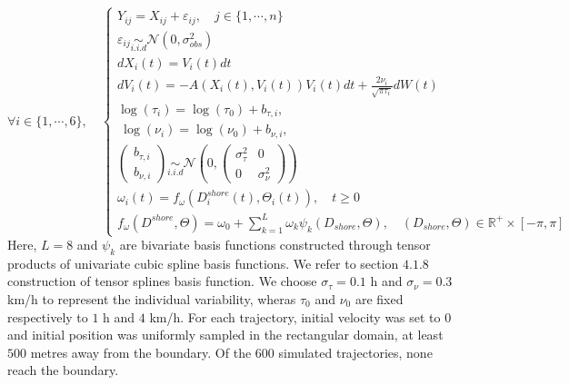 \documentclass[11pt]{article}
\newcommand {\R}{\mathbb{R}}
\newcommand {\1}{\mathbb{1}}
\begin{document}
\begin{equation}  \forall  i \in \{1,\cdots,6\}, \quad  \left\{
	\begin{array}{l}
		Y_{ij}=X_{ij}+\varepsilon_{ij}, \quad j \in \{1,\cdots, n\} \\
		\varepsilon_{ij} \underset{i.i.d}{\sim} \mathcal{N}(0,\sigma_{obs}^2) \\
		dX_i(t)=V_i(t) dt \quad \\
		dV_i(t)=-A(X_i(t),V_i(t))V_i(t)dt+\frac{2\nu_i}{\sqrt{\pi \tau_i}} dW(t)  \\
		\log(\tau_i)=\log(\tau_0)+b_{\tau,i}, \\\
		\log(\nu_i)=\log(\nu_0)+b_{\nu,i}, \\
		\begin{pmatrix} b_{\tau,i} \\ b_{\nu,i} \end{pmatrix} \underset{i.i.d}{\sim} \mathcal{N}\left(0,\begin{pmatrix} \sigma_{\tau}^2 & 0 \\ 0 & \sigma_{\nu}^2 \end{pmatrix}\right) \\
		\omega_i(t)=f_{\omega}(D^{shore}_i(t),\Theta_i(t)), \quad t \geq 0\\
		f_{\omega}(D^{shore},\Theta)=\omega_0+\sum_{k=1}^{L} \omega_k \psi_k(D_{shore},\Theta), \quad (D_{shore},\Theta) \in \R^+ \times [-\pi,\pi]
	\end{array}
	\right.
	\label{eq: rect simulation parameters}
\end{equation}
Here, $L=8$ and $\psi_k$ are bivariate basis functions constructed through tensor products of univariate cubic spline basis functions. We refer to \cite{wood_generalized_2017} section $4.
1.8$ construction of tensor splines basis function. We choose $\sigma_{\tau}=0.1$ h and $\sigma_{\nu}=0.3$ km/h to represent the individual variability, wheras $\tau_0$ and $\nu_0$ are fixed respectively to $1$ h and $4$ km/h.
For each trajectory, initial velocity was set to $0$ and initial position was uniformly sampled in the rectangular domain, at least $500$ metres away from the boundary.   Of the $600$ simulated trajectories, none reach the boundary.\\
\end{document}
